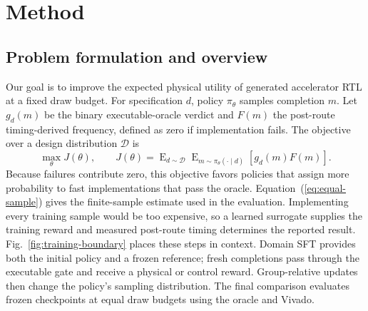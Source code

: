 \section{Method}
\label{sec:method}

\subsection{Problem formulation and overview}

Our goal is to improve the expected physical utility of generated accelerator
RTL at a fixed draw budget. For specification $d$, policy $\pi_\theta$ samples completion
$m$. Let $g_d(m)$ be the binary executable-oracle verdict and $F(m)$ the
post-route timing-derived frequency, defined as zero if implementation fails.
The objective over a design distribution $\mathcal{D}$ is
\begin{equation}
\max_\theta J(\theta),\qquad
J(\theta)=\operatorname{E}_{d\sim\mathcal{D}}
\operatorname{E}_{m\sim\pi_\theta(\cdot\mid d)}[g_d(m)F(m)].
\label{eq:problem}
\end{equation}
Because failures contribute zero, this objective favors policies that assign
more probability to fast implementations that pass the oracle.
Equation~(\ref{eq:equal-sample}) gives the finite-sample estimate used in the
evaluation. Implementing every training sample would be too expensive, so a
learned surrogate supplies the training reward and measured post-route timing
determines the reported result. Fig.~\ref{fig:training-boundary} places these
steps in context. Domain SFT provides both the initial policy and a frozen
reference; fresh completions pass through the executable gate and receive a
physical or control reward. Group-relative updates then change the policy's
sampling distribution. The final comparison evaluates frozen checkpoints at
equal draw budgets using the oracle and Vivado.


